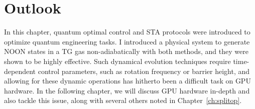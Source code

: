 \section{Outlook}

In this chapter, quantum optimal control and STA protocols were introduced to optimize quantum engineering tasks.
I introduced a physical system to generate NOON states in a TG gas non-adiabatically with both methods, and they were shown to be highly effective.
Such dynamical evolution techniques require time-dependent control parameters, such as rotation frequency or barrier height, and allowing for these dynamic operations has hitherto been a difficult task on GPU hardware.
In the following chapter, we will discuss GPU hardware in-depth and also tackle this issue, along with several others noted in Chapter~\ref{ch:splitop}.

